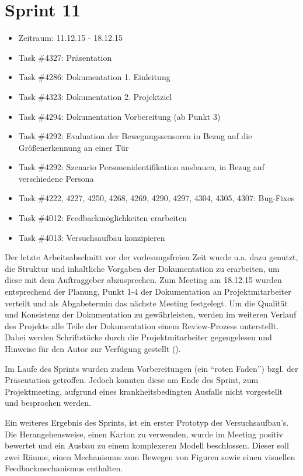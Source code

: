 \documentclass[12pt, oneside, smallheadings]{scrbook}
\begin{document}
\section{Sprint 11}
\begin{itemize}
	\item Zeitraum: 11.12.15 - 18.12.15 \newline
	\item Task \#4327: Präsentation
	\item Task \#4286: Dokumentation 1. Einleitung
	\item Task \#4323: Dokumentation 2. Projektziel
	\item Task \#4294: Dokumentation Vorbereitung (ab Punkt 3)
	\item Task \#4292: Evaluation der Bewegungssensoren in Bezug auf die Größenerkennung an einer Tür
	\item Task \#4292: Szenario Personenidentifikation ausbauen, in Bezug auf verschiedene Persona
	\item Task \#4222, 4227, 4250, 4268, 4269, 4290, 4297, 4304, 4305, 4307: Bug-Fixes
	\item Task \#4012: Feedbackmöglichkeiten erarbeiten
	\item Task \#4013: Versuchsaufbau konzipieren\\
\end{itemize}
\noindent
Der letzte Arbeitsabschnitt vor der vorlesungsfreien Zeit wurde u.a. dazu genutzt, die Struktur und inhaltliche Vorgaben der Dokumentation zu erarbeiten, um diese mit dem Auftraggeber abzusprechen. Zum Meeting am 18.12.15 wurden entsprechend der Planung, Punkt 1-4 der Dokumentation an Projektmitarbeiter verteilt und als Abgabetermin das nächste Meeting festgelegt. Um die Qualität und Konsistenz der Dokumentation zu gewährleisten, werden im weiteren Verlauf des Projekts alle Teile der Dokumentation einem Review-Prozess unterstellt. Dabei werden Schriftstücke durch die Projektmitarbeiter gegengelesen und Hinweise für den Autor zur Verfügung gestellt ().

Im Laufe des Sprints wurden zudem Vorbereitungen (ein "`roten Faden"') bzgl. der Präsentation getroffen. Jedoch konnten diese am Ende des Sprint, zum Projektmeeting, aufgrund eines krankheitsbedingten Ausfalls nicht vorgestellt und besprochen werden. 

Ein weiteres Ergebnis des Sprints, ist ein erster Prototyp des Versuchsaufbau's. Die Herangehensweise, einen Karton zu verwenden, wurde im Meeting positiv bewertet und ein Ausbau zu einem komplexeren Modell beschlossen. Dieser soll zwei Räume, einen Mechanismus zum Bewegen von Figuren sowie einen visuellen Feedbackmechanismus enthalten.
\end{document}
